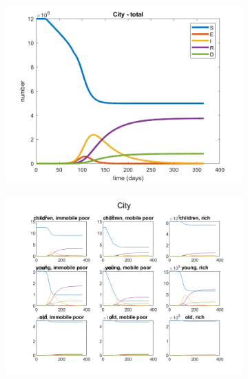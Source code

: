 \documentclass{article}
\begin{document}
\begin{figure}[H]
	\centering
	\begin{subfigure}[b]{0.5\textwidth}
		\includegraphics[width=\textwidth]{no-economic-effect/weak-mitigation/City-total}
	\end{subfigure}%
	\begin{subfigure}[b]{0.5\textwidth}
		\includegraphics[width=\textwidth]{no-economic-effect/weak-mitigation/City-all-cat}
	\end{subfigure}
	

\end{figure}
\end{document}
